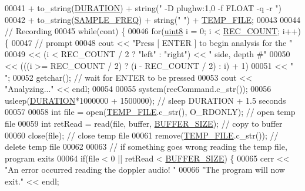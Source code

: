\begin{DoxyCode}
00041         + to\_string(\hyperlink{definitions_8hpp_ada7a88c013312e76596a2000cc8277fb}{DURATION}) + string(\textcolor{stringliteral}{" -D plughw:1,0 -f FLOAT -q -r "})
00042         + to\_string(\hyperlink{definitions_8hpp_a8ace559345ecba7978591ac2ef22aea4}{SAMPLE\_FREQ}) + string(\textcolor{stringliteral}{" "}) + \hyperlink{definitions_8hpp_a88f32e97c41b89ff0705d0a0b8566b41}{TEMP\_FILE};
00043 
00044     \textcolor{comment}{// Recording}
00045     \textcolor{keywordflow}{while}(cont) \{
00046         \textcolor{keywordflow}{for}(\hyperlink{definitions_8hpp_adde6aaee8457bee49c2a92621fe22b79}{uint8} i = 0; i < \hyperlink{definitions_8hpp_a2fd18fd694a2918f7d73eba821fd10b2}{REC\_COUNT}; i++) \{
00047             \textcolor{comment}{// prompt}
00048             cout << \textcolor{stringliteral}{"Press [ ENTER ] to begin analysis for the "}
00049                 << (i < REC\_COUNT / 2 ? \textcolor{stringliteral}{"left"} : \textcolor{stringliteral}{"right"}) << \textcolor{stringliteral}{" side, depth #"}
00050                 << (((i >= REC\_COUNT / 2) ? (i - REC\_COUNT / 2) : i) + 1)
00051                 << \textcolor{stringliteral}{" "};
00052             getchar();  \textcolor{comment}{// wait for ENTER to be pressed}
00053             cout << \textcolor{stringliteral}{"Analyzing..."} << endl;
00054 
00055             system(recCommand.c\_str());
00056             usleep(\hyperlink{definitions_8hpp_ada7a88c013312e76596a2000cc8277fb}{DURATION}*1000000 + 1500000);  \textcolor{comment}{// sleep DURATION + 1.5 seconds}
00057 
00058             \textcolor{keywordtype}{int} file = open(\hyperlink{definitions_8hpp_a88f32e97c41b89ff0705d0a0b8566b41}{TEMP\_FILE}.c\_str(), O\_RDONLY);  \textcolor{comment}{// open temp file}
00059             \textcolor{keywordtype}{int} retRead = read(file, buffer, \hyperlink{definitions_8hpp_aca681ed285767aaa2353bf3b42dd60ed}{BUFFER\_SIZE});  \textcolor{comment}{// copy to buffer}
00060             close(file);  \textcolor{comment}{// close temp file}
00061             \textcolor{keyword}{remove}(\hyperlink{definitions_8hpp_a88f32e97c41b89ff0705d0a0b8566b41}{TEMP\_FILE}.c\_str());  \textcolor{comment}{// delete temp file}
00062 
00063             \textcolor{comment}{// if something goes wrong reading the temp file, program exits}
00064             \textcolor{keywordflow}{if}(file < 0 || retRead < \hyperlink{definitions_8hpp_aca681ed285767aaa2353bf3b42dd60ed}{BUFFER\_SIZE}) \{
00065                 cerr << \textcolor{stringliteral}{"An error occurred reading the doppler audio! "}
00066                     \textcolor{stringliteral}{"The program will now exit."} << endl;

\end{DoxyCode}
